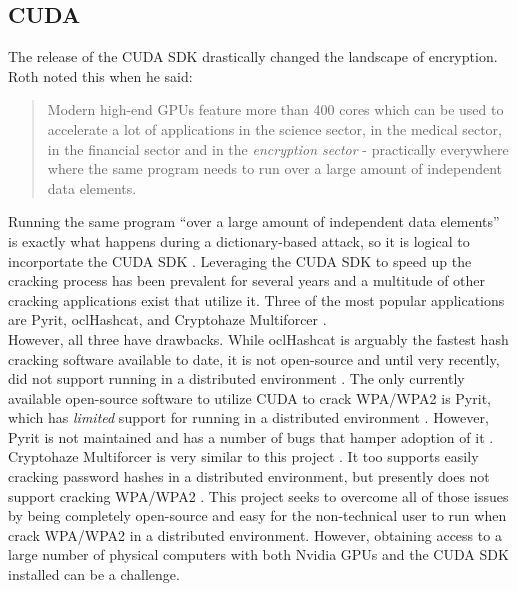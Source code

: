 \documentclass[12pt]{article}
\begin{document}
\subsection{CUDA}
\indent
The release of the CUDA SDK drastically changed the landscape of encryption. Roth noted this when he said:
\begin{quotation}
Modern high-end GPUs feature more than 400 cores which can be used to accelerate a lot of applications in the science sector, in the medical sector, in the financial sector and in the \emph{encryption sector} - practically everywhere where the same program needs to run over a large amount of independent data elements.
\end{quotation}
Running the same program ``over a large amount of independent data elements'' is exactly what happens during a dictionary-based attack, so it is logical to incorportate the CUDA SDK \cite{roth}. Leveraging the CUDA SDK to speed up the cracking process has been prevalent for several years and a multitude of other cracking applications exist that utilize it. Three of the most popular applications are Pyrit, oclHashcat, and Cryptohaze Multiforcer \cite{pyrit,ocl,crypto}.\\
\indent However, all three have drawbacks. While oclHashcat is arguably the fastest hash cracking software available to date, it is not open-source and until very recently, did not support running in a distributed environment \cite{ocl1}. The only currently available open-source software to utilize CUDA to crack WPA/WPA2 is Pyrit, which has \textit{limited} support for running in a distributed environment \cite{pyrit}. However, Pyrit is not maintained and has a number of bugs that hamper adoption of it \cite{pyrit}. Cryptohaze Multiforcer is very similar to this project \cite{crypto}. It too supports easily cracking password hashes in a distributed environment, but presently does not support cracking WPA/WPA2 \cite{crypto}. This project seeks to overcome all of those issues by being completely open-source and easy for the non-technical user to run when crack WPA/WPA2 in a distributed environment. However, obtaining access to a large number of physical computers with both Nvidia GPUs and the CUDA SDK installed can be a challenge.
\end{document}
